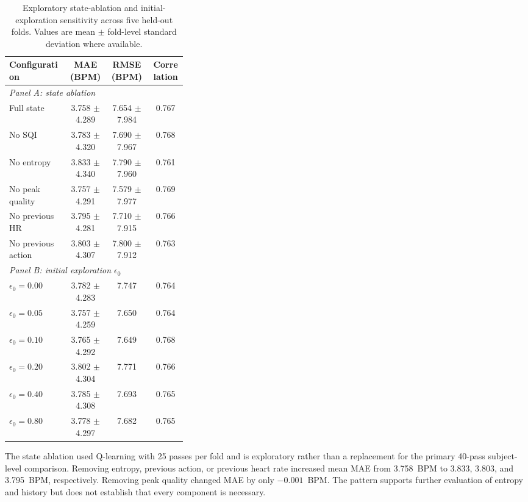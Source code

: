 \documentclass{elektr}
\begin{document}
\begin{table}[h!]
\caption{Exploratory state-ablation and initial-exploration sensitivity across
five held-out folds. Values are mean $\pm$ fold-level standard deviation where
available.}
\label{tab:ablation}
\begin{center}
\small
\begin{tabular}{p{0.34\linewidth}ccc}
\toprule
Configuration & MAE (BPM) & RMSE (BPM) & Correlation \\
\midrule
\multicolumn{4}{l}{\textit{Panel A: state ablation}}\\
Full state & 3.758 $\pm$ 4.289 & 7.654 $\pm$ 7.984 & 0.767 \\
No SQI & 3.783 $\pm$ 4.320 & 7.690 $\pm$ 7.967 & 0.768 \\
No entropy & 3.833 $\pm$ 4.340 & 7.790 $\pm$ 7.960 & 0.761 \\
No peak quality & 3.757 $\pm$ 4.291 & 7.579 $\pm$ 7.977 & 0.769 \\
No previous HR & 3.795 $\pm$ 4.281 & 7.710 $\pm$ 7.915 & 0.766 \\
No previous action & 3.803 $\pm$ 4.307 & 7.800 $\pm$ 7.912 & 0.763 \\
\midrule
\multicolumn{4}{l}{\textit{Panel B: initial exploration $\epsilon_0$}}\\
$\epsilon_0=0.00$ & 3.782 $\pm$ 4.283 & 7.747 & 0.764 \\
$\epsilon_0=0.05$ & 3.757 $\pm$ 4.259 & 7.650 & 0.764 \\
$\epsilon_0=0.10$ & 3.765 $\pm$ 4.292 & 7.649 & 0.768 \\
$\epsilon_0=0.20$ & 3.802 $\pm$ 4.304 & 7.771 & 0.766 \\
$\epsilon_0=0.40$ & 3.785 $\pm$ 4.308 & 7.693 & 0.765 \\
$\epsilon_0=0.80$ & 3.778 $\pm$ 4.297 & 7.682 & 0.765 \\
\bottomrule
\end{tabular}
\end{center}
\vs{-4mm}
\end{table}

The state ablation used Q-learning with 25 passes per fold and is exploratory rather than a replacement for the primary 40-pass subject-level comparison. Removing entropy, previous action, or previous heart rate increased mean MAE from 3.758~BPM to 3.833, 3.803, and 3.795~BPM, respectively. Removing peak quality changed MAE by only $-0.001$~BPM. The pattern supports further evaluation of entropy and history but does not establish that every component is necessary.
\end{document}
